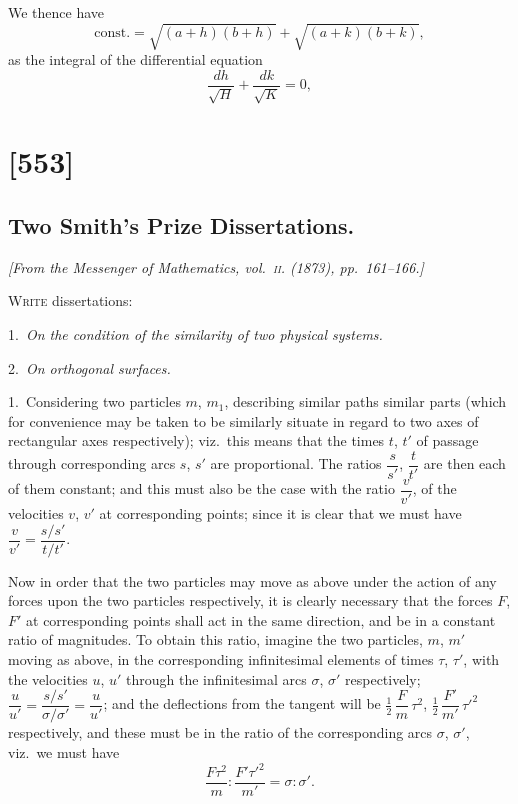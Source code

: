 \documentclass[11pt,a4paper]{book}
\begin{document}
We thence have
\[
\mathrm{const.} = \sqrt{(a + h)(b + h)} + \sqrt{(a + k)(b + k)},
\]
as the integral of the differential equation
\[
\frac{dh}{\sqrt{H}} + \frac{dk}{\sqrt{K}} = 0,
\]

\clearpage

\section{[553]}
\subsection{Two Smith's Prize Dissertations.}

\begin{center}
\textit{[From the Messenger of Mathematics, vol.~\textsc{ii}. (1873), pp.~161--166.]}
\end{center}

\textsc{Write} dissertations:

1.\ \textit{On the condition of the similarity of two physical systems.}

2.\ \textit{On orthogonal surfaces.}

1.\ Considering two particles $m$, $m_1$, describing similar paths similar parts
(which for convenience may be taken to be similarly situate in regard to two axes of
rectangular axes respectively); viz.\ this means that the times $t$, $t'$ of passage through
corresponding arcs $s$, $s'$ are proportional. The ratios $\dfrac{s}{s'}$, $\dfrac{t}{t'}$ are then each of them
constant; and this must also be the case with the ratio $\dfrac{v}{v'}$, of the velocities $v$, $v'$ at
corresponding points; since it is clear that we must have $\dfrac{v}{v'} = \dfrac{s/s'}{t/t'}$.

Now in order that the two particles may move as above under the action of
any forces upon the two particles respectively, it is clearly necessary that the forces
$F$, $F'$ at corresponding points shall act in the same direction, and be in a constant
ratio of magnitudes. To obtain this ratio, imagine the two particles, $m$, $m'$
moving as above, in the corresponding infinitesimal elements of times $\tau$, $\tau'$, with the
velocities $u$, $u'$ through the infinitesimal arcs $\sigma$, $\sigma'$ respectively; $\dfrac{u}{u'} = \dfrac{s/s'}{\sigma/\sigma'} = \dfrac{u}{u'}$; and the
deflections from the tangent will be $\tfrac{1}{2}\,\dfrac{F}{m}\,\tau^2$, $\tfrac{1}{2}\,\dfrac{F'}{m'}\,\tau'^2$ respectively, and these must
be in the ratio of the corresponding arcs $\sigma$, $\sigma'$, viz.\ we must have
\[
\frac{F\tau^2}{m} : \frac{F'\tau'^2}{m'} = \sigma : \sigma'.
\]
\end{document}
